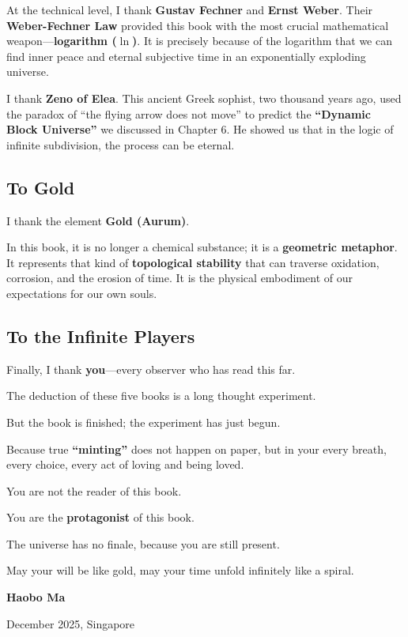At the technical level, I thank \textbf{Gustav Fechner} and \textbf{Ernst Weber}. Their \textbf{Weber-Fechner Law} provided this book with the most crucial mathematical weapon---\textbf{logarithm ($\ln$)}. It is precisely because of the logarithm that we can find inner peace and eternal subjective time in an exponentially exploding universe.

I thank \textbf{Zeno of Elea}. This ancient Greek sophist, two thousand years ago, used the paradox of ``the flying arrow does not move'' to predict the \textbf{``Dynamic Block Universe''} we discussed in Chapter 6. He showed us that in the logic of infinite subdivision, the process can be eternal.

\subsection{To Gold}

I thank the element \textbf{Gold (Aurum)}.

In this book, it is no longer a chemical substance; it is a \textbf{geometric metaphor}. It represents that kind of \textbf{topological stability} that can traverse oxidation, corrosion, and the erosion of time. It is the physical embodiment of our expectations for our own souls.

\subsection{To the Infinite Players}

Finally, I thank \textbf{you}---every observer who has read this far.

The deduction of these five books is a long thought experiment.

But the book is finished; the experiment has just begun.

Because true \textbf{``minting''} does not happen on paper, but in your every breath, every choice, every act of loving and being loved.

You are not the reader of this book.

You are the \textbf{protagonist} of this book.

The universe has no finale, because you are still present.

May your will be like gold, may your time unfold infinitely like a spiral.

\textbf{Haobo Ma}

December 2025, Singapore

